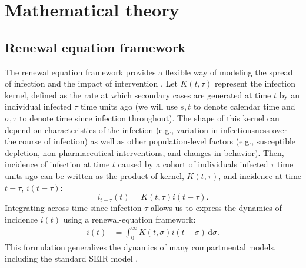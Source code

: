 \documentclass[12pt]{article}
\newcommand{\dd}[1]{\ensuremath{\, \mathrm{d}#1}}
\newcommand{\dsigma}{\dd{\sigma}}
\begin{document}
\section{Mathematical theory}

\subsection{Renewal equation framework}

The renewal equation framework provides a flexible way of modeling the spread of infection and the impact of intervention \citep{fraser2007estimating}.
Let $K(t, \tau)$ represent the infection kernel, defined as the rate at which secondary cases are generated at time $t$ by an individual infected $\tau$ time units ago (we will use $s, t$ to denote calendar time and $\sigma, \tau$ to denote time since infection throughout).
The shape of this kernel can depend on characteristics of the infection (e.g., variation in infectiousness over the course of infection) as well as other population-level factors (e.g., susceptible depletion, non-pharmaceutical interventions, and changes in behavior).
Then, incidence of infection at time $t$ caused by a cohort of individuals infected $\tau$ time units ago can be written as the product of kernel, $K(t, \tau)$, and incidence at time $t-\tau$, $i(t-\tau)$:
\begin{equation}
i_{t-\tau}(t) = K(t, \tau) i(t-\tau).
\end{equation}
Integrating across time since infection $\tau$ allows us to express the dynamics of incidence $i(t)$ using a renewal-equation framework: 
\begin{align}
i(t) &= \int_0^\infty K(t, \sigma) i(t-\sigma) \dsigma.
\label{eq:renewal}
\end{align}
This formulation generalizes the dynamics of many compartmental models, including the standard SEIR model \citep{heesterbeek1996concept, diekmann2000mathematical, roberts2004modelling, aldis2005integral, roberts2007model, champredon2018equivalence}.
\end{document}
